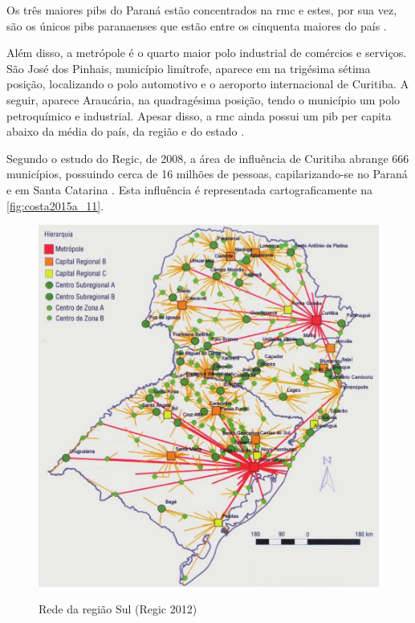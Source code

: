 	Os três maiores \gls{pib}s do Paraná estão concentrados na \glsdesc{rmc} e estes, por sua vez, são os únicos \gls{pib}s paranaenses que estão entre os cinquenta maiores do país \cite[p. 11]{costa2015a}.

	Além disso,  a metrópole é o quarto maior polo industrial de comércios e serviços. São José dos Pinhais, município limítrofe, aparece em na trigésima sétima posição, localizando o polo automotivo e o aeroporto internacional de Curitiba. A seguir, aparece Araucária, na quadragésima posição, tendo o município um polo petroquímico e industrial. Apesar disso, a \gls{rmc} ainda possui um \gls{pib} per capita abaixo da média do país, da região e do estado \cite[p. 11]{costa2015a}.
	
	Segundo o estudo do Regic, de 2008, a área de influência de Curitiba abrange 666 municípios, possuindo cerca de 16 milhões de pessoas, capilarizando-se no Paraná e em Santa Catarina \cite[p. 16]{costa2015a}. Esta influência é representada cartograficamente na \autoref{fig:costa2015a_11}.
	
	\begin{figure}
		\centering
		\caption{Rede da região Sul (Regic 2012)}
		\includegraphics[width=1.0\linewidth]{img/costa2015a_11}
		\label{fig:costa2015a_11}
	\end{figure}
	
